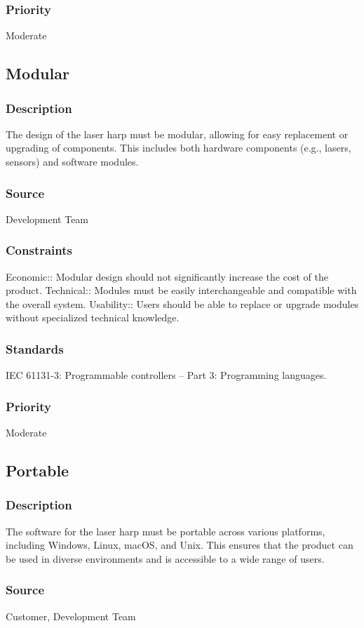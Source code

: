 \subsubsection{Priority}
Moderate


\subsection{Modular}
\subsubsection{Description}
The design of the laser harp must be modular, allowing for easy replacement or upgrading of components. This includes both hardware components (e.g., lasers, sensors) and software modules.
\subsubsection{Source}
Development Team
\subsubsection{Constraints}
Economic:: Modular design should not significantly increase the cost of the product.
Technical:: Modules must be easily interchangeable and compatible with the overall system.
Usability:: Users should be able to replace or upgrade modules without specialized technical knowledge.
\subsubsection{Standards}
IEC 61131-3: Programmable controllers – Part 3: Programming languages.
\subsubsection{Priority}
Moderate


\subsection{Portable}
\subsubsection{Description}
The software for the laser harp must be portable across various platforms, including Windows, Linux, macOS, and Unix. This ensures that the product can be used in diverse environments and is accessible to a wide range of users.
\subsubsection{Source}
Customer, Development Team
